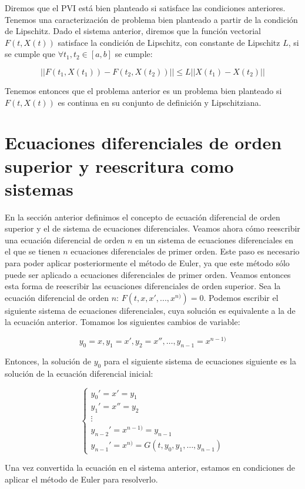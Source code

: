 \documentclass[12pt]{article}       %
\begin{document}
Diremos que el PVI está bien planteado si satisface las condiciones anteriores. Tenemos una caracterización de problema bien planteado a partir de la condición de Lipschitz. Dado el sistema anterior, diremos que la función vectorial $F(t, X(t))$ satisface la condición de Lipschitz, con constante de Lipschitz $L$, si se cumple que $\forall t_1, t_2 \in [a,b]$ se cumple:

$$ ||F(t_1, X(t_1)) - F(t_2, X(t_2))|| \leq L||X(t_1) - X(t_2)||$$

Tenemos entonces que el problema anterior es un problema bien planteado si $F(t, X(t))$ es continua en su conjunto de definición y Lipschitziana.

\section{Ecuaciones diferenciales de orden superior y reescritura como sistemas}

En la sección anterior definimos el concepto de ecuación diferencial de orden superior y el de sistema de ecuaciones diferenciales. Veamos ahora cómo reescribir una ecuación diferencial de orden $n$ en un sistema de ecuaciones diferenciales en el que se tienen $n$ ecuaciones diferenciales de primer orden. Este paso es necesario para poder aplicar posteriormente el método de Euler, ya que este método sólo puede ser aplicado a ecuaciones diferenciales de primer orden. Veamos entonces esta forma de reescribir las ecuaciones diferenciales de orden superior. Sea la ecuación diferencial de orden $n$: $ F(t, x, x', ..., x^{n)}) = 0 $. Podemos escribir el siguiente sistema de ecuaciones diferenciales, cuya solución es equivalente a la de la ecuación anterior. Tomamos los siguientes cambios de variable:

$$y_0 = x, y_1 = x', y_2 = x'', \dots, y_{n-1} = x^{n-1)}$$

Entonces, la solución de $y_0$ para el siguiente sistema de ecuaciones siguiente es la solución de la ecuación diferencial inicial:

$$
\begin{cases}
y_0' = x' = y_1\\
y_1' = x'' = y_2\\
\vdots\\
y_{n-2}' = x^{n-1)} = y_{n-1}\\
y_{n-1}' = x^{n)} = G(t, y_0, y_1, \dots, y_{n-1})
\end{cases}
$$

Una vez convertida la ecuación en el sistema anterior, estamos en condiciones de aplicar el método de Euler para resolverlo.
\end{document}

